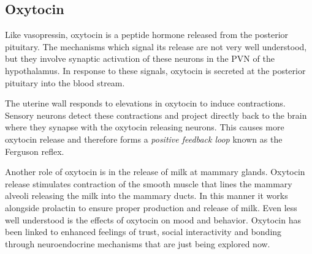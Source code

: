 \documentclass{tufte-handout}
\begin{document}
\subsection{Oxytocin}

Like vasopressin, oxytocin is a peptide hormone released from the posterior pituitary.  The mechanisms which signal its release are not very well understood, but they involve synaptic activation of these neurons in the PVN of the hypothalamus.  In response to these signals, oxytocin is secreted at the posterior pituitary into the blood stream.

  The uterine wall responds to elevations in oxytocin to induce contractions.  Sensory neurons detect these contractions and project directly back to the brain where they synapse with the oxytocin releasing neurons.  This causes more oxytocin release and therefore forms a \emph{positive feedback loop} known as the Ferguson reflex\cite{Ferguson1941}.

Another role of oxytocin is in the release of milk at mammary glands.  Oxytocin release stimulates contraction of the smooth muscle that lines the mammary alveoli releasing the milk into the mammary ducts.  In this manner it works alongside prolactin to ensure proper production and release of milk.  Even less well understood is the effects of oxytocin on mood and behavior.  Oxytocin has been linked to enhanced feelings of trust, social interactivity and bonding through neuroendocrine mechanisms that are just being explored now.

\listoffigures
\listoftables



\end{document}
